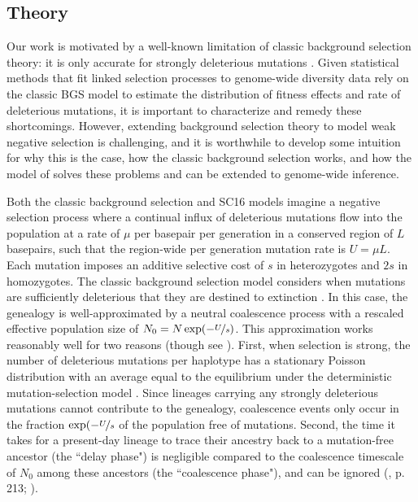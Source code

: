 \documentclass[11pt]{article}
\begin{document}
\subsection*{Theory}

Our work is motivated by a well-known limitation of classic background
selection theory: it is only accurate for strongly deleterious mutations
\parencite{Charlesworth1993-gb,McVean2000-bt,Good2013-lp,Gordo2002-dr}. Given
statistical methods that fit linked selection processes to genome-wide
diversity data rely on the classic BGS model to estimate the distribution of
fitness effects and rate of deleterious mutations, it is important to
characterize and remedy these shortcomings. However, extending background
selection theory to model weak negative selection is challenging, and it is
worthwhile to develop some intuition for why this is the case, how the classic
background selection works, and how the model of \textcite{Santiago2016-mu}
solves these problems and can be extended to genome-wide inference.

Both the classic background selection and SC16 models imagine a negative
selection process where a continual influx of deleterious mutations flow into
the population at a rate of $\mu$ per basepair per generation in a conserved
region of $L$ basepairs, such that the region-wide per generation mutation rate
is $U = \mu L$. Each mutation imposes an additive selective cost of $s$ in
heterozygotes and $2s$ in homozygotes. The classic background selection model
considers when mutations are sufficiently deleterious that they are destined to
extinction
\parencite{Charlesworth1993-gb,Nordborg1996-nq,Hudson1995-pt,Hudson1994-oh}. In
this case, the genealogy is well-approximated by a neutral coalescence process
with a rescaled effective population size of $N_0 = N \exp(-\nicefrac{U}{s})$.
This approximation works reasonably well for two reasons (though see
\textcite{Cvijovic2018-vd,Walczak2012-fi,Nicolaisen2012-vs}). First, when
selection is strong, the number of deleterious mutations per haplotype has a
stationary Poisson distribution with an average equal to the equilibrium under
the deterministic mutation-selection model \parencite{Haldane1927-ga}. Since
lineages carrying any strongly deleterious mutations cannot contribute to the
genealogy, coalescence events only occur in the fraction
$\exp(-\nicefrac{U}{s}$ of the population free of mutations. Second, the time
it takes for a present-day lineage to trace their ancestry back to a
mutation-free ancestor (the ``delay phase") is negligible compared to the
coalescence timescale of $N_0$ among these ancestors (the ``coalescence
phase"), and can be ignored (\textcite{Durrett2008-ql}, p. 213;
\textcite{Good2014-yz}).
\end{document}
